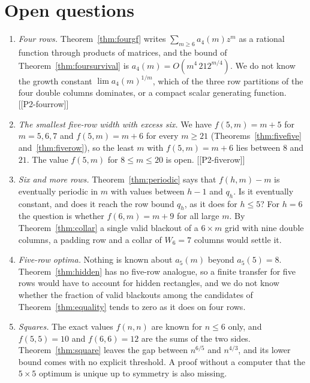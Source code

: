\section{Open questions}\label{sec:open}

\begin{enumerate}[(1),leftmargin=*]
\item \emph{Four rows.} Theorem~\ref{thm:fourgf} writes $\sum_{m\ge6}a_4(m)z^m$ as a
rational function through products of matrices, and the bound of
Theorem~\ref{thm:foursurvival} is $a_4(m)=O(m^4\,212^{m/4})$. We do not know the
growth constant
$\lim a_4(m)^{1/m}$, which of the three row partitions of the four double columns
dominates, or a compact scalar generating function. [[P2-fourrow]]
\item \emph{The smallest five-row width with excess six.} We have $f(5,m)=m+5$ for
$m=5,6,7$ and $f(5,m)=m+6$ for every $m\ge21$ (Theorems~\ref{thm:fivefive}
and~\ref{thm:fiverow}), so the least $m$ with $f(5,m)=m+6$ lies between $8$ and $21$.
The value $f(5,m)$ for $8\le m\le20$ is open. [[P2-fiverow]]
\item \emph{Six and more rows.} Theorem~\ref{thm:periodic} says that $f(h,m)-m$ is
eventually periodic in $m$ with values between $h-1$ and $q_h$. Is it eventually
constant, and does it reach the row bound $q_h$, as it does for $h\le5$? For $h=6$ the
question is whether $f(6,m)=m+9$ for all large $m$. By Theorem~\ref{thm:collar} a
single valid blackout of a $6\times m$ grid with nine double columns, a padding row
and a collar of $W_6=7$ columns would settle it.
\item \emph{Five-row optima.} Nothing is known about $a_5(m)$ beyond $a_5(5)=8$.
Theorem~\ref{thm:hidden} has no five-row analogue, so a finite transfer for five rows
would have to account for hidden rectangles, and we do not know whether the fraction
of valid blackouts among the candidates of Theorem~\ref{thm:equality} tends to zero
as it does on four rows.
\item \emph{Squares.} The exact values $f(n,n)$ are known for $n\le6$ only, and
$f(5,5)=10$ and $f(6,6)=12$ are the sums of the two sides. Theorem~\ref{thm:square}
leaves the gap between $n^{6/5}$ and $n^{4/3}$, and its lower bound comes with no
explicit threshold. A proof without a computer that the $5\times5$ optimum is unique
up to symmetry is also missing.
\end{enumerate}
